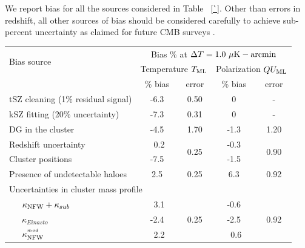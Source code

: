    We report bias for all the sources considered in Table ~\ref{`}. 
 Other than errors in redshift, all other sources of bias should be considered carefully to achieve sub-percent uncertainty as claimed for future CMB surveys \citep{cmbs4-sb1}. 
 \begin {table}[ht]
\centering
\begin{tabular}{| l | c  | c | c | c |}
    \hline
    \multirow{2}{*}{Bias source} & \multicolumn{4}{c|}{Bias \% at $\Delta T = 1.0\ \mu{\rm K-arcmin}$}\\
    \cline{2-5}
    & \multicolumn{2}{c|}{Temperature $T_{\rm ML}$} & \multicolumn{2}{c|}{Polarization $QU_{\rm ML}$} \\%
    \cline{2-5}
     & \% bias& error & \% bias & error \\\hline
    tSZ cleaning (1\% residual signal) & -6.3 & 0.50 & 0 & - \\\hline
    kSZ fitting (20\% uncertainty) & -7.3  & 0.31 & 0 & - \\\hline

    DG in the cluster & -4.5 & 1.70 & -1.3 & 1.20\\\hline
    \hline
    Redshift uncertainty & {\ }0.2 & \multirow{2}{*}{0.25} & -0.3 & \multirow{2}{*}{0.90} \\%
    \cline{1-2}\cline{4-4}
    Cluster positions & -7.5 & & -1.5 & \\\hline
    \hline
   Presence of undetectable haloes & 2.5 & 0.25  &6.3 &0.92\\
    \hline\hline
    \multicolumn{5}{|l|}{Uncertainties in cluster mass profile}\\\hline
   ~~~$\kappa_{\rm NFW} + \kappa_{sub}$ & {\ }3.1 & \multirow{4}{*}{0.25} & -0.6 & \multirow{4}{*}{0.92}\\%
    \cline{1-2}\cline{4-4}
    ~~~$\kappa_{Einasto}$ & -2.4 & & -2.5 &\\%
    \cline{1-2}\cline{4-4}
    ~~~$\kappa_{\rm NFW}^{^{mod}}$ & {\ }2.2  & & {\ }0.6 & \\\hline


\end{tabular}
\end{table}
